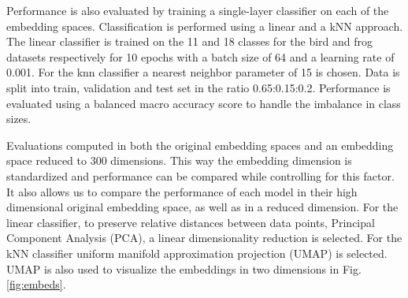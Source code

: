 Performance is also evaluated by training a single-layer classifier on each of the embedding spaces.
Classification is performed using a linear and a kNN approach.
The linear classifier is trained on the 11 and 18 classes for the bird and frog datasets respectively for 10 epochs with a batch size of 64 and a learning rate of 0.001. 
For the knn classifier a nearest neighbor parameter of 15 is chosen.
Data is split into train, validation and test set in the ratio 0.65:0.15:0.2.
Performance is evaluated using a balanced macro accuracy score \cite{brodersen_balanced_2010} to handle the imbalance in class sizes.

Evaluations computed in both the original embedding spaces and an embedding space reduced to 300 dimensions.
This way the embedding dimension is standardized and performance can be compared while controlling for this factor.
It also allows us to compare the performance of each model in their high dimensional original embedding space, as well as in a reduced dimension.
For the linear classifier, to preserve relative distances between data points, Principal Component Analysis (PCA), a linear dimensionality reduction is selected.
For the kNN classifier uniform manifold approximation projection (UMAP) \cite{mcinnes_umap_2020} is selected.
UMAP is also used to visualize the embeddings in two dimensions in Fig. \ref{fig:embeds}.